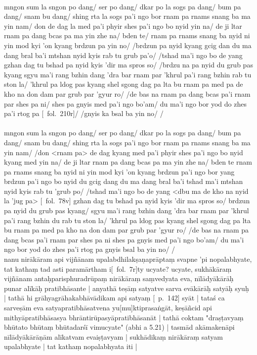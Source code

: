 \documentclass[12pt]{article}
\begin{document}
\textbf{\TVA}\\
mngon sum la sngon po dang/ ser po dang/ dkar po la sogs pa dang/ bum pa dang/ snam bu dang/ shing rta la sogs pa'i ngo bor rnam pa rnams snang ba ma yin nam/ don de dag la med pa'i phyir shes pa'i ngo bo nyid yin na/ de ji ltar rnam pa dang bcas pa ma yin zhe na/ bden te/ rnam pa rnams snang ba nyid ni yin mod kyi 'on kyang brdzun pa yin no/ /brdzun pa nyid kyang gcig dan du ma dang bral ba'i mtshan nyid kyis rab tu grub pa'o/ /tshad ma'i ngo bo de yang gzhan dag tu bshad pa nyid kyis 'dir ma spros so/ /brdzu na pa nyid du grub pas kyang sgyu ma'i rang bzhin dang 'dra bar rnam par 'khrul pa'i rang bzhin rab tu ston la/ 'khrul pa ldog pas kyang shel sgong dag pa lta bu rnam pa med pa de kho na don dam par grub par 'gyur ro/ /de bas na rnam pa dang bcas pa'i rnam par shes pa ni/ shes pa gnyis med pa'i ngo bo'am/ du ma'i ngo bor yod do zhes pa'i rtog pa [\TVA\ fol.\ 210r]/ /gnyis ka bsal ba yin no/ /\\

\textbf{\TVB}\\
mngon sum la sngon po dang/ ser po dang/ dkar po la sogs pa dang/ bum pa dang/ snam bu dang/ shing rta la sogs pa'i ngo bor rnam pa rnams snang ba ma yin nam/ /don <rnam pa> de dag kyang med pa'i phyir shes pa'i ngo bo nyid kyang med yin na/ de ji ltar rnam pa dang bcas pa ma yin zhe na/ bden te rnam pa rnams snang ba nyid ni yin mod kyi 'on kyang brdzun pa'i ngo bor yang brdzun pa'i ngo bo nyid du gcig dang du ma dang bral ba'i tshad ma'i mtshan nyid kyis rab tu 'grub po/ /tshad ma'i ngo bo de yang <dbu ma de kho na nyid la 'jug pa> [\TVB\ fol.\ 78v] gzhan dag tu bshad pa nyid kyis 'dir ma spros so/ brdzun pa nyid du grub pas kyang/ sgyu ma'i rang bzhin dang 'dra bar rnam par 'khrul pa'i rang bzhin du rab tu ston la/ 'khrul pa ldog pas kyang shel sgong dag pa lta bu rnam pa med pa kho na don dam par grub par 'gyur ro/ /de bas na rnam pa dang bcas pa'i rnam par shes pa ni shes pa gnyis med pa'i ngo bo'am/ du ma'i ngo bor yod do zhes pa'i rtog pa gnyis bsal ba yin no/ /\\

nanu nirākāram api vijñānam upalabdhilakṣaṇaprāptaṃ svapne 'pi nopalabhyate, tat kathaṃ tad asti paramārtham i[\MS\ fol.\ 7r]ty ucyate? ucyate, sukhākāraṃ vijñānam antaḥparisphuradrūpaṃ nirākāraṃ saṃvedyata eva, nīlādyākārāḥ punar alīkāḥ pratibhāsante | anyathā teṣāṃ satyatve sarva evākārāḥ satyāḥ syuḥ | tathā hi grāhyagrāhakabhāvādikam api satyaṃ [\EDD\ p.\ 142] syāt | tataś ca sarveṣām eva satyapratibhāsatvena yu[mu]ktiprasaṅgāt, keṣāñcid api mithyāpratibhāsasya bhrāntirūpasyāpratibhāsanāt | tathā coktam "draṣṭavyaṃ bhūtato bhūtaṃ bhūtadarśī vimucyate" (abhi a 5.21) | tasmād akāmakenāpi nīlādyākārāṇām alīkatvam evaiṣṭavyam | sukhādikaṃ nirākāraṃ satyam upalabhyate | tat kathaṃ nopalabhyata iti |\\
\end{document}
